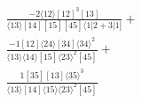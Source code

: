 \documentclass[varwidth, border=5pt]{standalone}
\begin{document}
\begin{my}
$\begin{gathered}
\scriptscriptstyle\frac{-2⟨12⟩[12]^3[13]}{⟨13⟩[14][15][45]⟨1|2+3|1]}+\\
\scriptscriptstyle\frac{-1[12]⟨24⟩[34]⟨34⟩^2}{⟨13⟩⟨14⟩[15]⟨23⟩^2[45]}+\\
\scriptscriptstyle\frac{1[35][13]⟨35⟩^3}{⟨13⟩[14]⟨15⟩⟨23⟩^2[45]}\phantom{+}
\end{gathered}$
\end{my}
\end{document}
